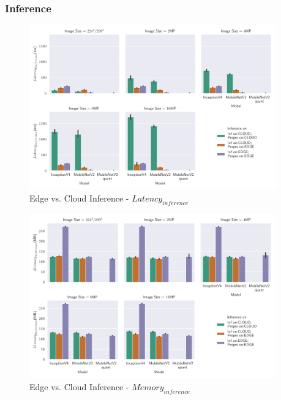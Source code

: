 \subsubsection{Inference}
\begin{figure}[H]
\centering
\includegraphics[width=0.95\textwidth]{./Bilder/single_plots/edge_vs_cloud_plots/Edge_vs_Cloud_Inference_Inference_Latencies.pdf}
\caption{Edge vs. Cloud Inference -  $Latency_{inference}$}
\label{fig:EdgeVsCloudInferenceLat}
\end{figure}
\begin{figure}[H]
\centering
\includegraphics[width=0.95\textwidth]{./Bilder/single_plots/edge_vs_cloud_plots/Edge_vs_Cloud_Inference_Inference_Memory.pdf}
\caption{Edge vs. Cloud Inference -  $Memory_{inference}$}
\label{fig:EdgeVsCloudInferenceMemory}
\end{figure}


